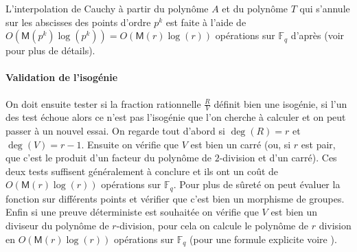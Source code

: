 \documentclass[10pt,a4paper]{book}
\theoremstyle{plain}
\theoremstyle{definition}
\theoremstyle{definition}
\newtheorem{lem}[thm]{Lemme}
\theoremstyle{definition}
\theoremstyle{definition}
\theoremstyle{definition}
\theoremstyle{remark}
\theoremstyle{remark}
\theoremstyle{definition}
\begin{document}
L'interpolation de Cauchy à partir du polynôme $A$ et du polynôme $T$ qui s'annule sur les abscisses des points d'ordre $p^k$ est faite à l'aide de $O(\mathsf{M}(p^{k})\log(p^k))=O(\mathsf{M}(r)\log(r))$ opérations sur $\mathbb{F}_q$ d'après \cite[§ 11.1]{vzGJG03} (voir \cite[Théorème 7.5]{algeff17} pour plus de détails).

%

\paragraph{Validation de l'isogénie} \label{par:val:iso}
 On doit ensuite tester si la fraction rationnelle $\frac{R}{V}$ définit bien une isogénie, si l'un des test échoue alors ce n'est pas l'isogénie que l'on cherche à calculer et on peut passer à un nouvel essai. On regarde tout d'abord si $\deg(R)=r$ et $\deg(V)=r-1$. Ensuite on vérifie que $V$ est bien un carré (ou, si $r$ est pair, que c'est le produit d'un facteur du polynôme de $2$-division et d'un carré). Ces deux tests suffisent généralement à conclure et ils ont un coût de $O(\mathsf{M}(r) \log(r))$ opérations sur $\mathbb{F}_q$. Pour plus de sûreté on peut évaluer la fonction sur différents points et vérifier que c'est bien un morphisme de groupes. Enfin si une preuve déterministe est souhaitée on vérifie que $V$ est bien un diviseur du polynôme de $r$-division, pour cela on calcule le polynôme de $r$ division en $O(\mathsf{M}(r)\log(r))$ opérations sur $\mathbb{F}_q$ (pour une formule explicite voire \cite[§4.4.5.a]{ehcc05}). 
\end{document}
